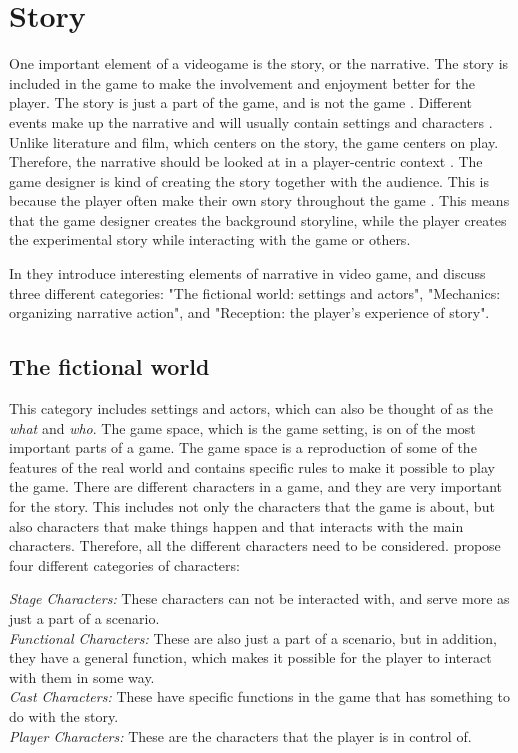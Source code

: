 \section{Story}
One important element of a videogame is the story, or the narrative. The story is included in the game to make the involvement and enjoyment better for the player. The story is just a part of the game, and is not the game \cite{umlapproach}.  Different events make up the narrative and will usually contain settings and characters \cite{understandingvg}. Unlike literature and film, which centers on the story, the game centers on play. Therefore, the narrative should be looked at in a player-centric context \cite{gametheory}. The game designer is kind of creating the story together with the audience. This is because the player often make their own story throughout the game \cite{umlapproach}. This means that the game designer creates the background storyline, while the player creates the experimental story while interacting with the game or others. 

In \cite{understandingvg} they introduce interesting elements of narrative in video game, and discuss three different categories: "The fictional world: settings and actors", "Mechanics: organizing narrative action", and "Reception: the player’s experience of story".

\subsection{The fictional world}
This category includes settings and actors, which can also be thought of as the \emph{what} and \emph{who}. The game space, which is the game setting, is on of the most important parts of a game. The game space is a reproduction of some of the features of the real world and contains specific rules to make it possible to play the game. There are different characters in a game, and they are very important for the story. This includes not only the characters that the game is about, but also characters that make things happen and that interacts with the main characters. Therefore, all the different characters need to be considered. \cite{understandingvg} propose four different categories of characters: 

\emph{Stage Characters:} These characters can not be interacted with, and serve more as just a part of a scenario. \\
\emph{Functional Characters:} These are also just a part of a scenario, but in addition, they have a general function, which makes it possible for the player to interact with them in some way. \\
\emph{Cast Characters:} These have specific functions in the game that has something to do with the story. \\
\emph{Player Characters:} These are the characters that the player is in control of. 

